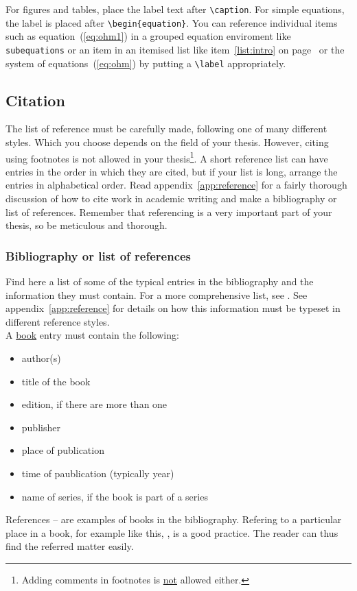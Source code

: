 \documentclass[english, 12pt, a4paper, sci, utf8, a-2b, online]{aaltothesis}
\begin{document}
For figures and tables, place the label text after \verb+\caption+. For simple 
equations, the label is placed after \verb+\begin{equation}+. You can reference
individual items such as equation~(\ref{eq:ohm1}) in a grouped equation 
enviroment like \verb+subequations+ or an item in an itemised list like 
item~\ref{list:intro} on page~\pageref{list:intro} or the system of 
equations~(\ref{eq:ohm}) by putting a \verb+\label+ appropriately.

\subsection{Citation}

The list of reference must be carefully made, following one of many different 
styles. Which you choose depends on the field of your thesis. However, citing 
using footnotes is not allowed in your thesis\footnote{Adding comments in 
footnotes is \underline{not} allowed either.}. A short reference list can have 
entries in the order in which they are cited, but if your list is long, arrange 
the entries in alphabetical order. Read appendix~\ref{app:reference} for a 
fairly thorough discussion of how to cite work in academic writing and make a 
bibliography or list of references. Remember that referencing is a very 
important part of your thesis, so be meticulous and thorough.

\subsubsection{Bibliography or list of references}

Find here a list of some of the typical entries in the bibliography and the 
information they must contain. For a more comprehensive list, see 
\cite{aaltolib}. See appendix~\ref{app:reference} for details on how this 
information must be typeset in different reference styles.\\

\noindent
A \underline{book} entry must contain the following:
\begin{itemize}
\setlength{\itemsep}{-3pt}
\item[--]author(s) 
\item[--]title of the book
\item[--]edition, if there are more than one
\item[--]publisher
\item[--]place of publication
\item[--]time of paublication (typically year)
\item[--]name of series, if the book is part of a series
\end{itemize}
References \cite{Kauranen}--\cite{Koblitz} are examples of books in the 
bibliography. Refering to a particular place in a book, for example like this, 
\cite[s.\ 83--124]{Koblitz}, is a good practice. The reader can thus find the 
referred matter easily.\\
\end{document}
